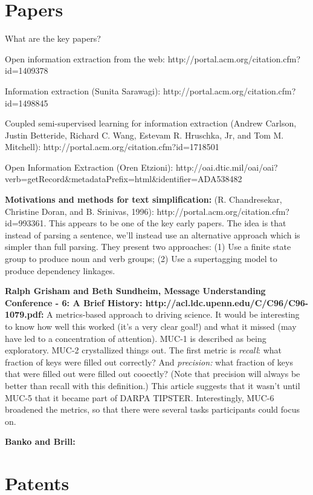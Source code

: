 \section{Papers}

What are the key papers?

Open information extraction from the web:
http://portal.acm.org/citation.cfm?id=1409378

Information extraction (Sunita Sarawagi):
http://portal.acm.org/citation.cfm?id=1498845

Coupled semi-supervised learning for information extraction (Andrew
Carlson, Justin Betteride, Richard C. Wang, Estevam R. Hruschka, Jr,
and Tom M. Mitchell): http://portal.acm.org/citation.cfm?id=1718501

Open Information Extraction (Oren Etzioni):
http://oai.dtic.mil/oai/oai?verb=getRecord\&metadataPrefix=html\&identifier=ADA538482

\textbf{Motivations and methods for text simplification:}
(R. Chandresekar, Christine Doran, and B. Srinivas, 1996):
http://portal.acm.org/citation.cfm?id=993361.  This appears to be one
of the key early papers.  The idea is that instead of parsing a
sentence, we'll instead use an alternative approach which is simpler
than full parsing.  They present two approaches: (1) Use a finite
state group to produce noun and verb groups; (2) Use a supertagging
model to produce dependency linkages.

\textbf{Ralph Grisham and Beth Sundheim, Message Understanding
  Conference - 6: A Brief History:
  http://acl.ldc.upenn.edu/C/C96/C96-1079.pdf:} A metrics-based
approach to driving science.  It would be interesting to know how well
this worked (it's a very clear goal!) and what it missed (may have led
to a concentration of attention).  MUC-1 is described as being
exploratory.  MUC-2 crystallized things out.  The first metric is
\emph{recall}: what fraction of keys were filled out correctly?  And
\emph{precision:} what fraction of keys that were filled out were
filled out cooectly?  (Note that precision will always be better than
recall with this definition.)  This article suggests that it wasn't
until MUC-5 that it became part of DARPA TIPSTER.  Interestingly,
MUC-6 broadened the metrics, so that there were several tasks
participants could focus on.

\textbf{Banko and Brill:}

\section{Patents}



